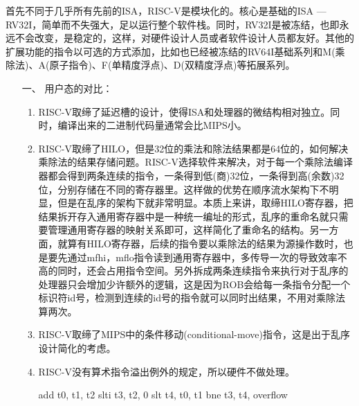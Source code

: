 首先不同于几乎所有先前的ISA，RISC-V是模块化的。核心是基础的ISA --- RV32I，简单而不失强大，足以运行整个软件栈。同时，RV32I是被冻结，也即永远不会改变，是稳定的，这样，对硬件设计人员或者软件设计人员都友好。其他的扩展功能的指令以可选的方式添加，比如也已经被冻结的RV64I基础系列和M(乘除法)、A(原子指令)、F(单精度浮点)、D(双精度浮点)等拓展系列\citep{Patterson:2017:RRO:3202479}。
\begin{enumerate}%
	\item[一、] 用户态的对比：
	\begin{enumerate}[label=(\alph*)]
		\item RISC-V取缔了延迟槽的设计，使得ISA和处理器的微结构相对独立。同时，编译出来的二进制代码量通常会比MIPS小。
		\item RISC-V取缔了HILO，但是32位的乘法和除法结果都是64位的，如何解决乘除法的结果存储问题。RISC-V选择软件来解决，对于每一个乘除法编译器都会得到两条连续的指令，一条得到低(商)32位，一条得到高(余数)32位，分别存储在不同的寄存器里。这样做的优势在顺序流水架构下不明显，但是在乱序的架构下就非常明显。本质上来讲，取缔HILO寄存器，把结果拆开存入通用寄存器中是一种统一编址的形式，乱序的重命名就只需要管理通用寄存器的映射关系即可，这样简化了重命名的结构。另一方面，就算有HILO寄存器，后续的指令要以乘除法的结果为源操作数时，也是要先通过mfhi，mflo指令读到通用寄存器中，多传导一次的导致效率不高的同时，还会占用指令空间。另外拆成两条连续指令来执行对于乱序的处理器只会增加少许额外的逻辑，这是因为ROB会给每一条指令分配一个标识符id号，检测到连续的id号的指令就可以同时出结果，不用对乘除法算两次。
		\item RISC-V取缔了MIPS中的条件移动(conditional-move)指令，这是出于乱序设计简化的考虑。
		\item RISC-V没有算术指令溢出例外的规定，所以硬件不做处理。
		\begin{scala}
			add t0, t1, t2
			slti t3, t2, 0
			slt t4, t0, t1
			bne t3, t4, overflow
		\end{scala}
	

\end{enumerate}
\end{enumerate}
